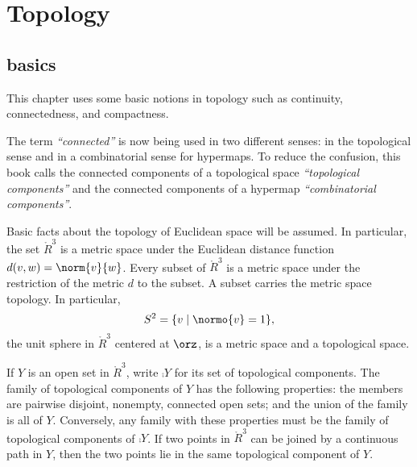\section{Topology}\label{sec:topology}

\subsection{basics}

This chapter uses some basic
notions in topology such as continuity, connectedness, and compactness.

\begin{remark} The term {\it ``connected''} is now being used in
two different senses: in the topological sense and in a combinatorial
sense for hypermaps.    To reduce the confusion, this book calls the connected components
of a topological space {\it ``topological components''} and the connected
components of a hypermap {\it ``combinatorial components''}.
\end{remark}
%
%
%


Basic facts about the topology of Euclidean space will be assumed.  In particular,
the set $\ring{R}^3$ is a metric space under the
Euclidean distance function $d(v,w) = \norm{v}{w}$.  Every subset of
$\ring{R}^3$ is a metric space under the restriction of the metric
$d$ to the subset.  A subset carries the metric space topology.
In particular, $$S^2 = \{ v \mid \normo{ v} = 1\},$$ the unit sphere in
$\ring{R}^3$ centered at $\orz$, is a metric space and a topological space.

If $Y$ is an open set in $\ring{R}^3$, write
$\comp{Y}$ for its set of topological components.
%
The family of topological components of $Y$ has the following properties:
the members are pairwise disjoint, nonempty, connected open sets; and the
union of the family is all of $Y$.
Conversely, any family with these properties must be the
family of topological components of $\comp{Y}$.
If two
points in $\ring{R}^3$ 
can be joined by a continuous path in $Y$,
then the two points lie in the same topological component of $Y$.
%
%
%
 






